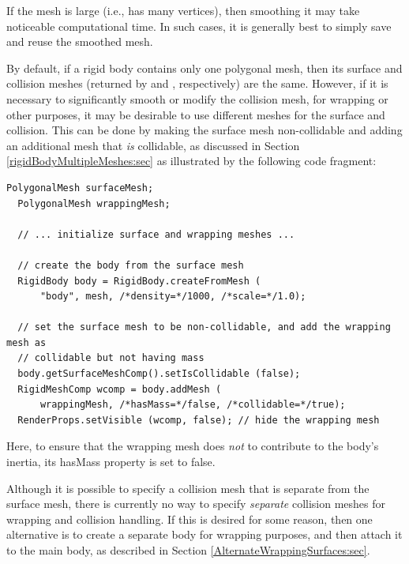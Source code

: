 \begin{sideblock}
If the mesh is large (i.e., has many vertices), then smoothing it may
take noticeable computational time. In such cases, it is generally best
to simply save and reuse the smoothed mesh.
\end{sideblock}

By default, if a rigid body contains only one polygonal mesh, then its
surface and collision meshes (returned by
 and
, respectively) are
the same.  However, if it is necessary to significantly smooth or
modify the collision mesh, for wrapping or other purposes, it may be
desirable to use different meshes for the surface and collision. This
can be done by making the surface mesh non-collidable and adding an
additional mesh that {\it is} collidable, as discussed in Section
\ref{rigidBodyMultipleMeshes:sec} as illustrated by the following code
fragment:
%
\begin{lstlisting}[]
  PolygonalMesh surfaceMesh;
  PolygonalMesh wrappingMesh;

  // ... initialize surface and wrapping meshes ...

  // create the body from the surface mesh
  RigidBody body = RigidBody.createFromMesh (
      "body", mesh, /*density=*/1000, /*scale=*/1.0);

  // set the surface mesh to be non-collidable, and add the wrapping mesh as
  // collidable but not having mass
  body.getSurfaceMeshComp().setIsCollidable (false);
  RigidMeshComp wcomp = body.addMesh (
      wrappingMesh, /*hasMass=*/false, /*collidable=*/true);
  RenderProps.setVisible (wcomp, false); // hide the wrapping mesh
\end{lstlisting}
%
Here, to ensure that the wrapping mesh does {\it not} to contribute to
the body's inertia, its {\sf hasMass} property is set to false.

Although it is possible to specify a collision mesh that is separate
from the surface mesh, there is currently no way to specify {\it separate}
collision meshes for wrapping and collision handling.  If this is
desired for some reason, then one alternative is to create a separate
body for wrapping purposes, and then attach it to the main body, as
described in Section \ref{AlternateWrappingSurfaces:sec}.

